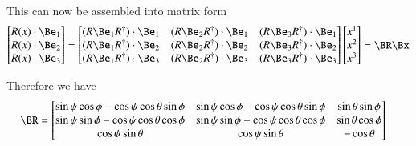 \documentclass{article}      %
\begin{document}
This can now be assembled into matrix form
\begin{align*}
\begin{bmatrix}
R(x) \cdot \Be_1 \\
R(x) \cdot \Be_2 \\
R(x) \cdot \Be_3
\end{bmatrix}
=
\begin{bmatrix}
(R \Be_1 R^\dagger) \cdot \Be_1 & (R \Be_2 R^\dagger) \cdot \Be_1 & (R \Be_3 R^\dagger) \cdot \Be_1 \\
(R \Be_1 R^\dagger) \cdot \Be_2 & (R \Be_2 R^\dagger) \cdot \Be_2 & (R \Be_3 R^\dagger) \cdot \Be_2 \\
(R \Be_1 R^\dagger) \cdot \Be_3 & (R \Be_2 R^\dagger) \cdot \Be_3 & (R \Be_3 R^\dagger) \cdot \Be_3 \\
\end{bmatrix}
\begin{bmatrix}
x^1 \\
x^2 \\
x^3 \\
\end{bmatrix} = \BR \Bx
\end{align*}

Therefore we have
\begin{align}
\BR &=
\begin{bmatrix}
\sin\psi \cos\phi - \cos\psi \cos\theta \sin\phi   & \sin\psi \cos\phi - \cos\psi \cos\theta \sin\phi & \sin\theta \sin\phi \\
\sin\psi \sin\phi - \cos\psi \cos\theta \cos\phi   & \sin\psi \sin\phi - \cos\psi \cos\theta \cos\phi & \sin\theta \cos\phi \\
\cos\psi \sin\theta                                & \cos\psi \sin\theta                              & -\cos\theta \\
\end{bmatrix}
\end{align}

\end{document}
